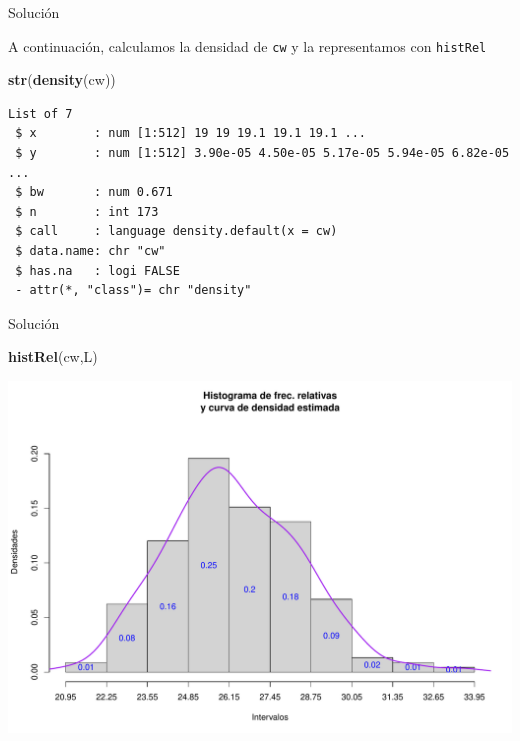 \documentclass[
  ignorenonframetext,
]{beamer}
\newenvironment{Shaded}{\begin{snugshade}}{\end{snugshade}}
\newcommand{\KeywordTok}[1]{\textcolor[rgb]{0.13,0.29,0.53}{\textbf{#1}}}
\newcommand{\NormalTok}[1]{#1}
\begin{document}
\begin{frame}[fragile]{Solución}
\protect\hypertarget{soluciuxf3n-43}{}

A continuación, calculamos la densidad de \texttt{cw} y la representamos
con \texttt{histRel}

\begin{Shaded}
\begin{Highlighting}[]
\KeywordTok{str}\NormalTok{(}\KeywordTok{density}\NormalTok{(cw))}
\end{Highlighting}
\end{Shaded}

\begin{verbatim}
List of 7
 $ x        : num [1:512] 19 19 19.1 19.1 19.1 ...
 $ y        : num [1:512] 3.90e-05 4.50e-05 5.17e-05 5.94e-05 6.82e-05 ...
 $ bw       : num 0.671
 $ n        : int 173
 $ call     : language density.default(x = cw)
 $ data.name: chr "cw"
 $ has.na   : logi FALSE
 - attr(*, "class")= chr "density"
\end{verbatim}

\end{frame}

\begin{frame}[fragile]{Solución}
\protect\hypertarget{soluciuxf3n-44}{}

\begin{Shaded}
\begin{Highlighting}[]
\KeywordTok{histRel}\NormalTok{(cw,L)}
\end{Highlighting}
\end{Shaded}

\includegraphics{Tema9.-Agrupacion_datos_cuantitativos_files/figure-beamer/unnamed-chunk-59-1.pdf}

\end{frame}
\end{document}

